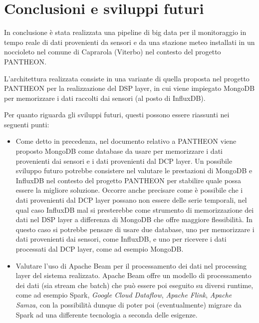 \section{Conclusioni e sviluppi futuri}
In conclusione è stata realizzata una pipeline di big data per il monitoraggio in tempo reale di dati provenienti da sensori e da una stazione meteo installati in un noccioleto nel comune di Caprarola (Viterbo) nel contesto del progetto PANTHEON.\par

L'architettura realizzata consiste in una variante di quella proposta nel progetto PANTHEON per la realizzazione del DSP layer, in cui viene impiegato MongoDB per memorizzare i dati raccolti dai sensori (al posto di InfluxDB).\par

Per quanto riguarda gli sviluppi futuri, questi possono essere riassunti nei seguenti punti:

\begin{itemize}
    \item Come detto in precedenza, nel documento relativo a PANTHEON viene proposto MongoDB come database da usare per memorizzare i dati provenienti dai sensori e i dati provenienti dal DCP layer. Un possibile sviluppo futuro potrebbe consistere nel valutare le prestazioni di MongoDB e InfluxDB nel contesto del progetto PANTHEON per stabilire quale possa essere la migliore soluzione. Occorre anche precisare come è possibile che i dati provenienti dal DCP layer possano non essere delle serie temporali, nel qual caso InfluxDB mal si presterebbe come strumento di memorizzazione dei dati nel DSP layer a differenza di MongoDB che offre maggiore flessibilità. In questo caso si potrebbe pensare di usare due database, uno per memorizzare i dati provenienti dai sensori, come InfluxDB, e uno per ricevere i dati processati dal DCP layer, come ad esempio MongoDB.
    \item Valutare l'uso di Apache Beam per il processamento dei dati nel processing layer del sistema realizzato. Apache Beam offre un modello di processamento dei dati (sia stream che batch) che può essere poi eseguito su diversi runtime, come ad esempio Spark, \textit{Google Cloud Dataflow}, \textit{Apache Flink}, \textit{Apache Samza}, con la possibilità dunque di poter poi (eventualmente) migrare da Spark ad una differente tecnologia a seconda delle esigenze.
\end{itemize}{}
